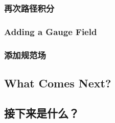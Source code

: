\documentclass{article}
\begin{document}
\begin{paracol}{2}
\subsubsection*{再次路径积分}
\switchcolumn*

\subsubsection{Adding a Gauge Field}
\switchcolumn
\subsubsection*{添加规范场}
\switchcolumn*

\subsection{What Comes Next?}
\switchcolumn
\subsection*{接下来是什么？}
\switchcolumn*
\end{paracol}
\end{document}
